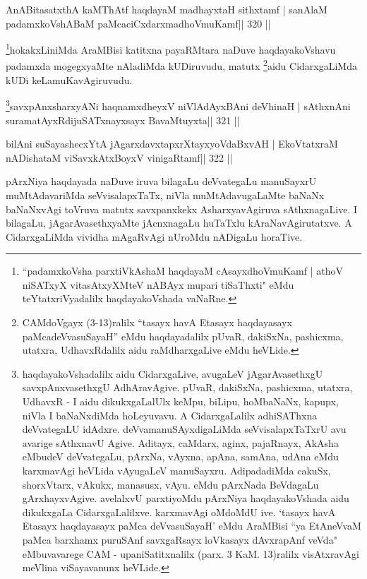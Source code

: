 \begin{shl}
AnABitasatxthA kaMThAtf haqdayaM madhayxtaH sithxtamf |
sanAlaM padamxkoVshABaM paMcaciCxdarxmadhoVmuKamf\hfill || 320 ||
\end{shl}

\begin{artha}
\footnote{``padamxkoVsha parxtiVkAshaM haqdayaM cAsayxdhoVmuKamf | 
athoV niSATxyX vitasAtxyXMteV nABAyx mupari tiSaThxti" eMdu 
teYtatxriVyadalilx haqdayakoVshada vaNaRne.}hokakxLiniMda 
AraMBisi katitxna payaRMtara naDuve haqdayakoVshavu padamxda 
mogegxyaMte nAladiMda kUDiruvudu, matutx \footnote{CAMdoVgayx 
(3-13)ralilx ``tasayx havA Etasayx haqdayasayx paMcadeVvasuSayaH'' eMdu 
haqdayadalilx pUvaR, dakiSxNa, pashicxma, utatxra, UdhavxRdalilx aidu 
raMdharxgaLive eMdu heVLide.}aidu CidarxgaLiMda kUDi keLamuKavAgiruvudu.
\end{artha}

\begin{shl}
\footnote{haqdayakoVshadalilx aidu CidarxgaLive, avugaLeV 
jAgarAvasethxgU savxpAnxvasethxgU AdhAravAgive. pUvaR, dakiSxNa, 
pashicxma, utatxra, UdhavxR - I aidu dikukxgaLalUlx keMpu, biLipu, 
hoMbaNaNx, kapupx, niVla I baNaNxdiMda hoLeyuvavu. A CidarxgaLalilx 
adhiSAThxna deVvategaLU idAdxre. deVvamanuSAyxdigaLiMda 
seVvisalapxTaTxrU avu avarige sAthxnavU Agive. Aditayx, caMdarx, aginx, 
pajaRnayx, AkAsha eMbudeV deVvategaLu, pArxNa, vAyxna, apAna, samAna, 
udAna eMdu karxmavAgi heVLida vAyugaLeV manuSayxru. AdipadadiMda 
cakuSx, shorxVtarx, vAkukx, manasusx, vAyu. eMdu pArxNada BeVdagaLu 
gArxhayxvAgive. avelalxvU parxtiyoMdu pArxNiya haqdayakoVshada aidu 
dikukxgaLa CidarxgaLalilxve. karxmavAgi oMdoMdU ive. `tasayx havA 
Etasayx haqdayasayx paMca deVvasuSayaH' eMdu AraMBisi ``ya EtAneVvaM 
paMca barxhamx puruSAnf savxgaRsayx loVkasayx dAvxrapAnf veVda" 
eMbuvavarege CAM - upaniSatitxnalilx (parx. 3 KaM. 13)ralilx visAtxravAgi meVlina viSayavanunx heVLide.}savxpAnxsharxyANi haqnamxdheyxV niVlAdAyxBAni deVhinaH |
sAthxnAni suramatAyxRdijuSATxnayxsayx BavaMtuyxta\hfill || 321 ||
\end{shl}

\begin{shl}
bilAni suSayashecxYtA jAgarxdavxtapxrXtayxyoVdaBxvAH |
EkoVtatxraM nADishataM viSavxkAtxBoyxV vinigaRtamf\hfill || 322 ||
\end{shl}

\begin{artha}
pArxNiya haqdayada naDuve iruva bilagaLu deVvategaLu manuSayxrU  muMtAdavariMda seVvisalapxTaTx, niVla muMtAdavugaLaMte baNaNx  baNaNxvAgi toVruva matutx savxpanxkekx AsharxyavAgiruva sAthxnagaLive.  I bilagaLu, jAgarAvasethxyaMte jAcnxnagaLu huTaTxlu kAraNavAgirutatxve. A CidarxgaLiMda vividha mAgaRvAgi nUroMdu nADigaLu horaTive.
\end{artha}

